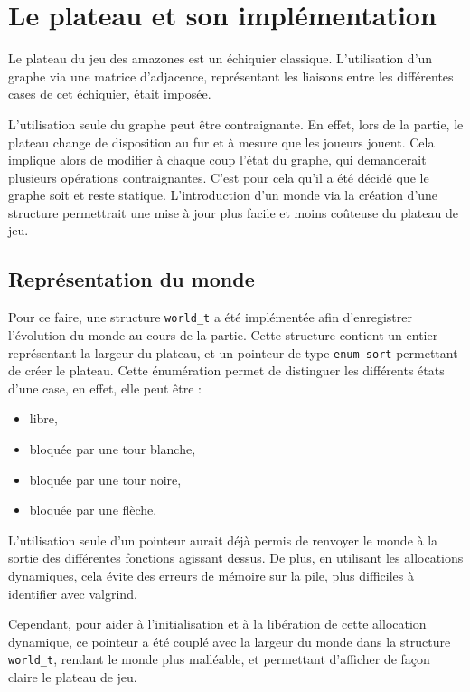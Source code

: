 \chapter{Le plateau et son implémentation}
Le plateau du jeu des amazones est un échiquier classique. L'utilisation d'un graphe via une matrice d'adjacence, représentant les liaisons entre les différentes cases de cet échiquier, était imposée. 

L'utilisation seule du graphe peut être contraignante. En effet, lors de la partie, le plateau change de disposition au fur et à mesure que les joueurs jouent. Cela implique alors de modifier à chaque coup l'état du graphe, qui demanderait plusieurs opérations contraignantes. C'est pour cela qu'il a été décidé que le graphe soit et reste statique. L'introduction d'un monde via la création d'une structure permettrait une mise à jour plus facile et moins coûteuse du plateau de jeu.  
\section{Représentation du monde}

Pour ce faire, une structure \texttt{world\_t} a été implémentée afin d'enregistrer l'évolution du monde au cours de la partie. Cette structure contient un entier représentant la largeur du plateau, et un pointeur de type \texttt{enum sort} permettant de créer le plateau. Cette énumération permet de distinguer les différents états d'une case, en effet, elle peut être :
\begin{itemize}
    \item libre,
    \item bloquée par une tour blanche,
    \item bloquée par une tour noire,
    \item bloquée par une flèche.
\end{itemize}

\bigbreak

L'utilisation seule d'un pointeur aurait déjà permis de renvoyer le monde à la sortie des différentes fonctions agissant dessus. De plus, en utilisant les allocations dynamiques, cela évite des erreurs de mémoire sur la pile, plus difficiles à identifier avec valgrind.

Cependant, pour aider à l'initialisation et à la libération de cette allocation dynamique, ce pointeur a été couplé avec la largeur du monde dans la structure \texttt{world\_t}, rendant le monde plus malléable, et permettant d'afficher de façon claire le plateau de jeu.

